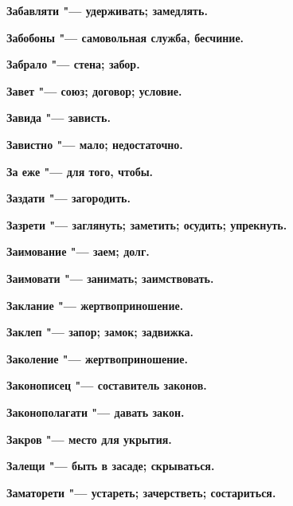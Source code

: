 \begin{mymulticols}{2}
\bfseries Забавляти\normalfont{} "--- удерживать; замедлять. 




\bfseries Забобоны\normalfont{} "--- самовольная служба, бесчиние. 




\bfseries Забрало\normalfont{} "--- стена; забор. 




\bfseries Завет\normalfont{} "--- союз; договор; условие. 




\bfseries Завида\normalfont{} "--- зависть. 




\bfseries Завистно\normalfont{} "--- мало; недостаточно. 




\bfseries За еже\normalfont{} "--- для того, чтобы. 




\bfseries Заздати\normalfont{} "--- загородить. 




\bfseries Зазрети\normalfont{} "--- заглянуть; заметить; осудить; упрекнуть. 




\bfseries Заимование\normalfont{} "--- заем; долг. 




\bfseries Заимовати\normalfont{} "--- занимать; заимствовать. 




\bfseries Заклание\normalfont{} "--- жертвоприношение. 




\bfseries Заклеп\normalfont{} "--- запор; замок; задвижка. 




\bfseries Заколение\normalfont{} "--- жертвоприношение. 




\bfseries Законописец\normalfont{} "--- составитель законов. 




\bfseries Законополагати\normalfont{} "--- давать закон. 




\bfseries Закров\normalfont{} "--- место для укрытия. 




\bfseries Залещи\normalfont{} "--- быть в засаде; скрываться. 




\bfseries Заматорети\normalfont{} "--- устареть; зачерстветь; состариться. 





\end{mymulticols}
